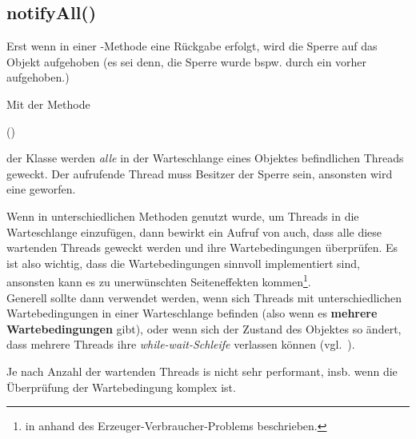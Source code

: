 \subsection{notifyAll()}\label{subsec:notifyAll}

Erst wenn in einer -Methode eine Rückgabe erfolgt, wird die Sperre auf das Objekt aufgehoben (es sei denn, die Sperre wurde bspw. durch ein  vorher aufgehoben.)

\noindent
Mit der Methode

\begin{center}
     ()
\end{center}

\noindent
der Klasse  werden \textit{alle} in der Warteschlange eines Objektes befindlichen Threads geweckt.
\noindent
Der aufrufende Thread muss Besitzer der Sperre sein, ansonsten wird eine  geworfen.

\begin{tcolorbox}[enlarge top by=0.5cm,enlarge bottom by=0.5cm]
Wenn in unterschiedlichen Methoden  genutzt wurde, um Threads in die Warteschlange einzufügen, dann bewirkt ein Aufruf von  auch, dass alle diese wartenden Threads geweckt werden und ihre Wartebedingungen überprüfen.
Es ist also wichtig, dass die Wartebedingungen sinnvoll implementiert sind, ansonsten kann es zu unerwünschten Seiteneffekten kommen\footnote {
    in \cite[70 f.]{Oec22} anhand des Erzeuger-Verbraucher-Problems beschrieben.
}.\\
Generell sollte  dann verwendet werden, wenn sich Threads mit unterschiedlichen Wartebedingungen in einer Warteschlange befinden (also wenn es \textbf{mehrere Wartebedingungen} gibt), oder wenn sich der Zustand des Objektes so ändert, dass mehrere Threads ihre \textit{while-wait-Schleife} verlassen können (vgl.~\cite[73]{Oec22}).
\end{tcolorbox}


\noindent
Je nach Anzahl der wartenden Threads is  nicht sehr performant, insb. wenn die Überprüfung der Wartebedingung komplex ist.

